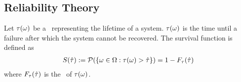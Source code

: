 \subsection{Reliability Theory}
Let $\tau(\omega)$ be a \rv\ representing the lifetime of a system.
$\tau(\omega)$ is the time until a failure after which the system cannot be recovered.
The survival function is defined as
\begin{align*}
  S(\hat{\tau}) := \mathcal{P}(\{ \omega \in \Omega: \tau(\omega) > \hat{\tau} \}) = 1 - F_\tau(\hat{\tau})
\end{align*}
where $F_\tau(\hat{\tau})$ is the \cdf\ of $\tau(\omega)$.
